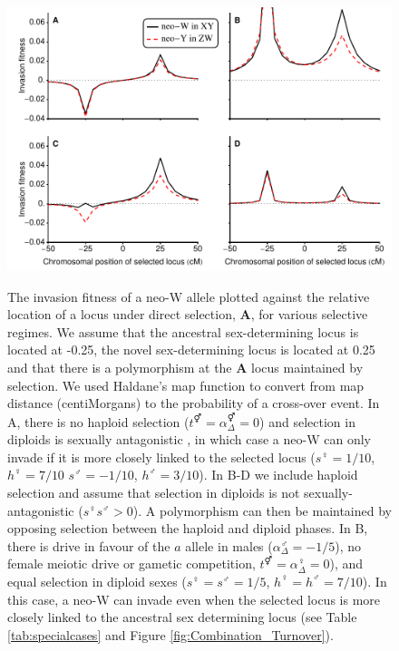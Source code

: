 \documentclass[12pt]{article}
\begin{document}
\begin{figure}[!h]
\centering
\includegraphics[width=\linewidth]{PositionPlot}\\
\caption{
The invasion fitness of a neo-W allele plotted against the relative location of a locus under direct selection, \textbf{A}, for various selective regimes. 
We assume that the ancestral sex-determining locus is located at -0.25, the novel sex-determining locus is located at 0.25 and that there is a polymorphism at the \textbf{A} locus maintained by selection.
We used Haldane's map function \citep[Equation 3 in ][]{Haldane1919} to convert from map distance (centiMorgans) to the probability of a cross-over event. 
In A, there is no haploid selection ($t^\Hermaphrodite=\alpha^\Hermaphrodite_{\Delta}=0$) and selection in diploids is sexually antagonistic \citep[following][]{vanDoorn:2010hu}, in which case a neo-W can only invade if it is more closely linked to the selected locus ($s^\female=1/10$, $h^\female=7/10$ $s^\male=-1/10$, $h^\male=3/10$).
In B-D we include haploid selection and assume that selection in diploids is not sexually-antagonistic ($s^\female s^\male>0$). 
A polymorphism can then be maintained by opposing selection between the haploid and diploid phases. 
In B, there is drive in favour of the $a$ allele in males ($\alpha^\male_{\Delta}=-1/5$), no female meiotic drive or gametic competition, $t^\Hermaphrodite=\alpha^\female_{\Delta}=0$), and equal selection in diploid sexes ($s^\female=s^\male=1/5$, $h^\female=h^\male=7/10$). In this case, a neo-W can invade even when the selected locus is more closely linked to the ancestral sex determining locus (see Table \ref{tab:specialcases} and Figure \ref{fig:Combination_Turnover}). 
}
\end{figure}
\end{document}
